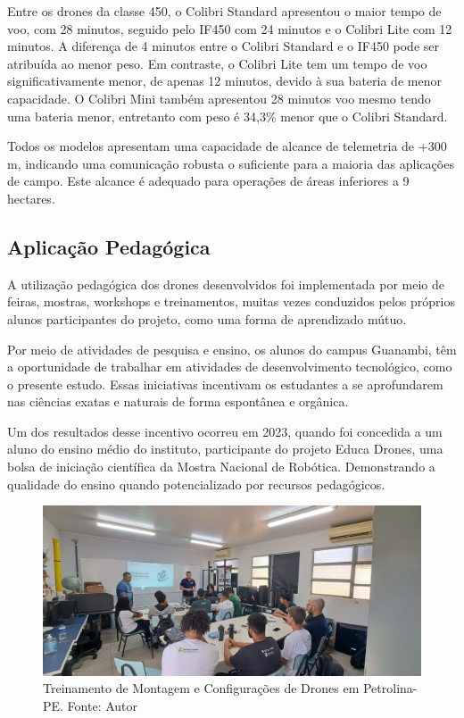 \documentclass[conference]{IEEEtran}
\begin{document}
Entre os drones da classe 450, o Colibri Standard  apresentou o maior tempo de voo, com 28 minutos, seguido pelo IF450 com 24 minutos e o Colibri Lite com 12 minutos. A diferença de 4 minutos entre o Colibri Standard e o IF450 pode ser atribuída ao menor peso. Em contraste, o Colibri Lite tem um tempo de voo significativamente menor, de apenas 12 minutos, devido à sua bateria de menor capacidade. O Colibri Mini também apresentou 28 minutos voo mesmo tendo uma bateria menor, entretanto com peso é 34,3\% menor que o Colibri Standard. 

Todos os modelos apresentam uma capacidade de alcance de telemetria de +300 m, indicando uma comunicação robusta o suficiente para a maioria das aplicações de campo. Este alcance é adequado para operações de áreas inferiores a 9 hectares.

\subsection{Aplicação Pedagógica}

A utilização pedagógica dos drones desenvolvidos foi implementada por meio de feiras, mostras, workshops e treinamentos, muitas vezes conduzidos pelos próprios alunos participantes do projeto, como uma forma de aprendizado mútuo.

Por meio de atividades de pesquisa e ensino, os alunos do campus Guanambi, têm a oportunidade de trabalhar em atividades de desenvolvimento tecnológico, como o presente estudo. Essas iniciativas incentivam os estudantes a se aprofundarem nas ciências exatas e naturais de forma espontânea e orgânica.

Um dos resultados desse incentivo ocorreu em 2023, quando foi concedida a um aluno  do ensino médio do instituto, participante do projeto Educa Drones, uma bolsa de iniciação científica da Mostra Nacional de Robótica. Demonstrando a qualidade do ensino quando potencializado por recursos pedagógicos.

\begin{figure}[!htb]
    \centering
    \includegraphics[scale=0.12]{img/petrolina.jpg} 
    \caption{Treinamento de Montagem e Configurações de Drones em Petrolina-PE. Fonte: Autor}
    \label{fig:petrolina}
\end{figure}
\end{document}
